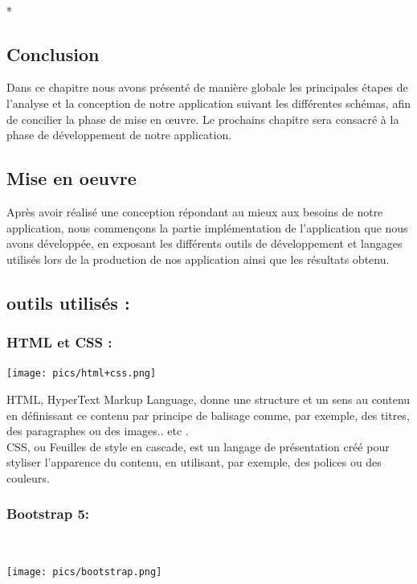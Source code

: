  \\*


\section{Conclusion}

Dans ce chapitre nous avons présenté de manière globale les principales étapes de l'analyse et la conception de notre application suivant les différentes schémas, afin de concilier la phase de mise en œuvre. Le prochains chapitre sera consacré à la phase de développement de notre application.

\begin{center}
\chapter{Mise en oeuvre}    
\end{center}


Après avoir réalisé une conception répondant au mieux aux besoins de notre application, nous commençons la partie implémentation de l'application que nous avons développée, en exposant les différents outils de développement et langages utilisés lors de la production de nos application ainsi que les résultats obtenu.\\


\section{outils utilisés :}
\centuring
\subsection{HTML et CSS :}
\begin{center}
\texttt{[image: pics/html+css.png]}    
\end{center}


HTML, HyperText Markup Language, donne une structure et un sens au contenu en définissant ce contenu par principe de balisage comme, par exemple, des titres, des paragraphes ou des images.. etc . \\
 CSS, ou Feuilles de style en cascade, est un langage de présentation créé pour styliser l'apparence du contenu, en utilisant, par exemple, des polices ou des couleurs. \\

\subsection{Bootstrap 5:}
\\
\begin{center}
\texttt{[image: pics/bootstrap.png]}    
\end{center}


